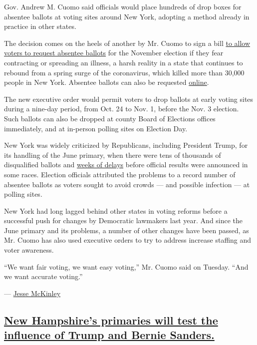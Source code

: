 Gov. Andrew M. Cuomo said officials would place hundreds of drop boxes
for absentee ballots at voting sites around New York, adopting a method
already in practice in other states.

The decision comes on the heels of another by Mr. Cuomo to sign a bill
\href{https://www.nytimes3xbfgragh.onion/2020/08/20/nyregion/vote-by-mail-new-york.html?searchResultPosition=4}{to
allow voters to request absentee ballots} for the November election if
they fear contracting or spreading an illness, a harsh reality in a
state that continues to rebound from a spring surge of the coronavirus,
which killed more than 30,000 people in New York. Absentee ballots can
also be requested
\href{https://absenteeballot.elections.ny.gov/Home/Search?aspxerrorpath=/\%e2\%80\%8b}{online}.

The new executive order would permit voters to drop ballots at early
voting sites during a nine-day period, from Oct. 24 to Nov. 1, before
the Nov. 3 election. Such ballots can also be dropped at county Board of
Elections offices immediately, and at in-person polling sites on
Election Day.

New York was widely criticized by Republicans, including President
Trump, for its handling of the June primary, when there were tens of
thousands of disqualified ballots and
\href{https://www.nytimes3xbfgragh.onion/2020/07/17/nyregion/election-absentee-ballots-primary.html}{weeks
of delays} before official results were announced in some races.
Election officials attributed the problems to a record number of
absentee ballots as voters sought to avoid crowds --- and possible
infection --- at polling sites.

New York had long lagged behind other states in voting reforms before a
successful push for changes by Democratic lawmakers last year. And since
the June primary and its problems, a number of other changes have been
passed, as Mr. Cuomo has also used executive orders to try to address
increase staffing and voter awareness.

``We want fair voting, we want easy voting,'' Mr. Cuomo said on Tuesday.
``And we want accurate voting.''

--- \href{https://www.nytimes3xbfgragh.onion/by/jesse-mckinley}{Jesse
McKinley}

\hypertarget{new-hampshires-primaries-will-test-the-influence-of-trump-and-bernie-sanders}{%
\subsection{\texorpdfstring{\protect\hyperlink{new-hampshires-primaries-will-test-the-influence-of-trump-and-bernie-sanders}{New
Hampshire's primaries will test the influence of Trump and Bernie
Sanders.}}{New Hampshire's primaries will test the influence of Trump and Bernie Sanders.}}\label{new-hampshires-primaries-will-test-the-influence-of-trump-and-bernie-sanders}}

